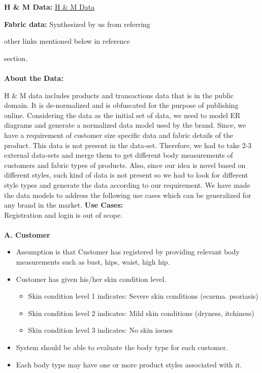 \documentclass[11pt,journal,compsoc]{IEEEtran}
\begin{document}
\textbullet \textbf{H \& M Data:} \href{https://www.kaggle.com/datasets/odins0n/hm256x256}{ H \& M Data} \

\textbullet \textbf{Fabric data:} Synthesized by us from referring \ 

other links mentioned below in reference \ 

section.\\\\
\textbf{About the Data:} \

H \& M data includes products and transactions data that is in the public domain. It is de-normalized and is obfuscated for the purpose of publishing online. Considering the data as the initial set of data, we need to model ER diagrams and generate a normalized data model used by the brand. Since, we have a requirement of customer size specific data and fabric details of the product. This data is not present in the data-set. Therefore, we had to take 2-3 external data-sets and merge them to get different body measurements of customers and fabric types of products. Also, since our idea is novel based on different styles, such kind of data is not present so we had to look for different style types and generate the data according to our requirement. We have made the data models to address the following use cases which can be generalized for any brand in the market.
\newpage 
\noindent \textbf{Use Cases:} \\
Registration and login is out of scope.\\\\
\textbf{A. Customer}
\begin{itemize}
\item[\ding{220}]Assumption is that Customer has registered by providing relevant body measurements such as bust, hips, waist, high hip. 
\item[\ding{220}]Customer has given his/her skin condition level. 
\begin{itemize}
    \item Skin condition level 1 indicates: Severe skin conditions (eczema. psoriasis) 
    \item Skin condition level 2 indicates: Mild skin conditions (dryness, itchiness) 
    \item Skin condition level 3 indicates: No skin issues 
\end{itemize}
\item[\ding{220}]System should be able to evaluate the body type for each customer. 
\item[\ding{220}]Each body type may have one or more product styles associated with it. 
\end{itemize}
\end{document}
